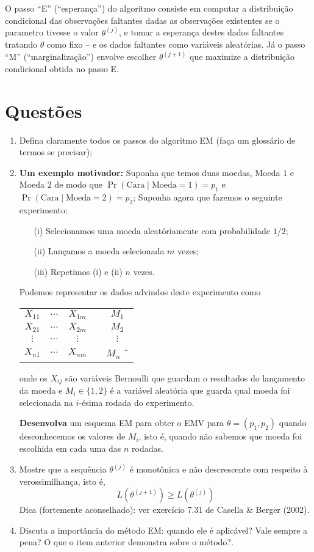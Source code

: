 \documentclass[a4paper,10pt, notitlepage]{report}
\begin{document}
O passo ``E'' (``esperança'') do algoritmo consiste em computar a distribuição condicional das observações faltantes dadas as observações existentes se o parametro tivesse o valor $\theta^{(j)}$,  e tomar a esperança destes dados faltantes tratando $\theta$ como fixo -- e os dados faltantes como variáveis aleatórias.
Já o passo ``M'' (``marginalização'') envolve escolher $\theta^{(j+1)}$ que maximize a distribuição condicional obtida no passo E. 

\section*{Questões}
\begin{enumerate}
 \item Defina claramente todos os passos do algoritmo EM (faça um glossário de termos se precisar);
 \item \textbf{Um exemplo motivador:} Suponha que temos duas moedas, Moeda $1$ e Moeda $2$ de modo que $\operatorname{Pr}(\text{Cara} \mid \text{Moeda} = 1) = p_1$ e $\operatorname{Pr}(\text{Cara} \mid \text{Moeda} = 2) = p_2$; 
 Suponha agora que fazemos o seguinte experimento:
 \begin{itemize}
  \item[(i)] Selecionamos uma moeda aleatóriamente com probabilidade $1/2$;
  \item[(ii)] Lançamos a moeda selecionada $m$ vezes;
  \item[(iii)] Repetimos (i) e (ii) $n$ vezes.
 \end{itemize}
 Podemos representar os dados advindos deste experimento como 
\begin{center}
\begin{tabular}{ c c c c c}
 $X_{11}$ & $\ldots$ & $X_{1m}$ & & $M_1$  \\ 
 $X_{21}$ & $\ldots$ & $X_{2m}$ & & $M_2$  \\
 $\vdots$ & $\ldots$ & $\vdots$ & & $\vdots$  \\
 $X_{n1}$ & $\ldots$ & $X_{nm}$ & & $M_n$ ¨
\end{tabular}
\end{center}
 
 onde os $X_{ij}$ são variáveis Bernoulli que guardam o resultados do lançamento da moeda  e $M_i \in \{ 1, 2\}$ é a variável aleatória que guarda qual moeda foi selecionada na $i$-ésima rodada do experimento.
 
 \textbf{Desenvolva} um esquema EM para obter o EMV para $\theta = (p_1, p_2)$ quando desconhecemos os valores de $M_i$, isto é, quando não sabemos que moeda foi escolhida em cada uma das $n$ rodadas.
 
 \item Mostre que a sequência $\theta^{(j)}$ é monotônica e não descrescente com respeito à verossimilhança, isto é,
 \[ L\left(\theta^{(j + 1)}\right) \geq L\left(\theta^{(j)}\right) \]
 Dica (fortemente aconselhado): ver exercício 7.31 de Casella \& Berger (2002). 
 \item Discuta a importância do método EM: quando ele é aplicável? Vale sempre a pena? O que o item anterior demonstra sobre o método?.
\end{enumerate}




\end{document}
